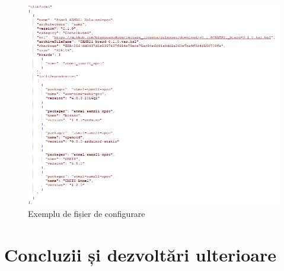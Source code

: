 \documentclass[12pt,a4paper]{report}
\begin{document}
\begin{figure}[!htb]
\centering
\includegraphics[scale=0.8]{pics/json.png}
  \caption{Exemplu de fișier de configurare}
  \label{fig:json}
\end{figure}


\chapter{Concluzii și dezvoltări ulterioare}
\end{document}
